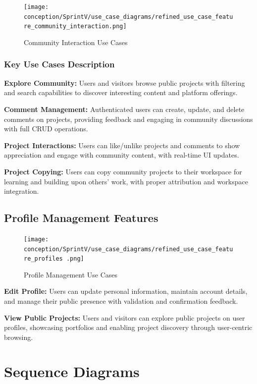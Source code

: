\begin{figure}[H]
\centering
\texttt{[image: conception/SprintV/use\_case\_diagrams/refined\_use\_case\_feature\_community\_interaction.png]}
\caption{Community Interaction Use Cases}
\label{fig:community_interaction_use_case}
\end{figure}

\subsubsection{Key Use Cases Description}

\textbf{Explore Community:} Users and visitors browse public projects with filtering and search capabilities to discover interesting content and platform offerings.

\textbf{Comment Management:} Authenticated users can create, update, and delete comments on projects, providing feedback and engaging in community discussions with full CRUD operations.

\textbf{Project Interactions:} Users can like/unlike projects and comments to show appreciation and engage with community content, with real-time UI updates.

\textbf{Project Copying:} Users can copy community projects to their workspace for learning and building upon others' work, with proper attribution and workspace integration.

\subsection{Profile Management Features}

\begin{figure}[H]
\centering
\texttt{[image: conception/SprintV/use\_case\_diagrams/refined\_use\_case\_feature\_profiles .png]}
\caption{Profile Management Use Cases}
\label{fig:profile_management_use_case}
\end{figure}

\textbf{Edit Profile:} Users can update personal information, maintain account details, and manage their public presence with validation and confirmation feedback.

\textbf{View Public Projects:} Users and visitors can explore public projects on user profiles, showcasing portfolios and enabling project discovery through user-centric browsing.

\section{Sequence Diagrams}


